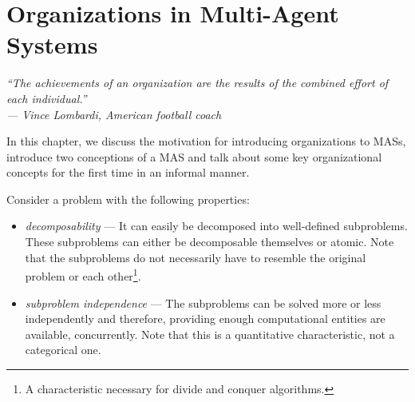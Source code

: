 
\chapter{Organizations in Multi-Agent Systems}

\begin{flushright}
\textit{``The achievements of an organization are the results of the combined effort of each individual.''}\\
\textit{--- Vince Lombardi, American football coach}
\end{flushright}

In this chapter, we discuss the motivation for introducing organizations to MASs, introduce two conceptions of a MAS and talk about some key organizational concepts for the first time in an informal manner.

Consider a problem with the following properties:
\begin{itemize}
	\item \textit{decomposability} --- It can easily be decomposed into well-defined subproblems. These subproblems can either be decomposable themselves or atomic.
	Note that the subproblems do not necessarily have to resemble the original problem or each other\footnote{A characteristic necessary for divide and conquer algorithms.}.
	\item \textit{subproblem independence} --- The subproblems can be solved more or less independently and therefore, providing enough computational entities are available, concurrently.
	Note that this is a quantitative characteristic, not a categorical one.
\end{itemize}

